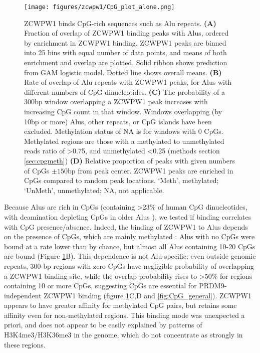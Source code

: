 \begin{figure}[H]
	\centering
	\texttt{[image: figures/zcwpw1/CpG\_plot\_alone.png]}
	\caption[ZCWPW1 binds CpG rich sequences]{
		ZCWPW1 binds CpG-rich sequences such as Alu repeats.
		\textbf{(A)} Fraction of overlap of ZCWPW1 binding peaks with Alus, ordered by enrichment in ZCWPW1 binding. ZCWPW1 peaks are binned into 25 bins with equal number of data points, and means of both enrichment and overlap are plotted. Solid ribbon shows prediction from GAM logistic model. Dotted line shows overall means.
		\textbf{(B)} Rate of overlap of Alu repeats with ZCWPW1 peaks, for Alus with different numbers of CpG dinucleotides.
		\textbf{(C)} The probability of a 300bp window overlapping a ZCWPW1 peak increases with increasing CpG count in that window. Windows overlapping (by 10bp or more) Alus, other repeats, or CpG islands have been excluded. Methylation status of NA is for windows with 0 CpGs. Methylated regions are those with a methylated to unmethylated reads ratio of >0.75, and unmethylated <0.25 (methods section \ref{sec:cpgmeth})
		\textbf{(D)} Relative proportion of peaks with given numbers of CpGs $\pm150$bp from peak center. ZCWPW1 peaks are enriched in CpGs compared to random peak locations. ‘Meth’, methylated; ‘UnMeth’, unmethylated; NA, not applicable.
	}
	\label{fig:CpG}
\end{figure}

Because Alus are rich in CpGs (containing >23\% of human CpG dinucleotides, with deamination depleting CpGs in older Alus \parencite{Luo2014Dynamic}), we tested if binding correlates with CpG presence/absence. Indeed, the binding of ZCWPW1 to Alus depends on the presence of CpGs, which are mainly methylated \parencite{Gaysinskaya2018Transient}: Alus with no CpGs were bound at a rate lower than by chance, but almost all Alus containing 10-20 CpGs are bound (Figure \ref{fig:CpG}B). This dependence is not Alu-specific: even outside genomic repeats, 300-bp regions with zero CpGs have negligible probability of overlapping a ZCWPW1 binding site, while the overlap probability rises to >50\% for regions containing 10 or more CpGs, suggesting CpGs are essential for PRDM9-independent ZCWPW1 binding (figure \ref{fig:CpG}C,D and \ref{fig:CpG_general}). ZCWPW1 appears to have greater affinity for methylated CpG pairs, but retains some affinity even for non-methylated regions. This binding mode was unexpected a priori, and does not appear to be easily explained by patterns of H3K4me3/H3K36me3 in the genome, which do not concentrate as strongly in these regions.

